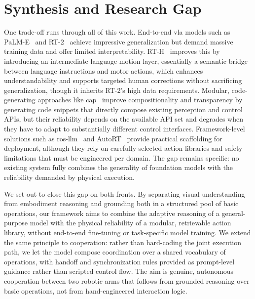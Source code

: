 \documentclass[
     12pt,
     a4paper,
     BCOR=10mm,
     DIV=14,
     listof=totoc,
     bibliography=totoc,
     parskip,
     twoside,
     headsepline
     ]{scrreprt}
\begin{document}
\section{Synthesis and Research Gap}
One trade-off runs through all of this work. End-to-end \gls{vla} models such as PaLM-E~\cite{driess2023palmeembodiedmultimodallanguage} and RT-2~\cite{brohan2023rt2visionlanguageactionmodelstransfer} achieve impressive generalization but demand massive training data and offer limited interpretability. RT-H~\cite{belkhale2024rthactionhierarchiesusing} improves this by introducing an intermediate language-motion layer, essentially a semantic bridge between language instructions and motor actions, which enhances understandability and supports targeted human corrections without sacrificing generalization, though it inherits RT-2's high data requirements. Modular, code-generating approaches like \gls{cap}~\cite{liang2023codepolicieslanguagemodel} improve compositionality and transparency by generating code snippets that directly compose existing perception and control APIs, but their reliability depends on the available API set and degrades when they have to adapt to substantially different control interfaces. Framework-level solutions such as \gls{ros}-\gls{llm}~\cite{Mower_2026} and AutoRT~\cite{ahn2024autortembodiedfoundationmodels} provide practical scaffolding for deployment, although they rely on carefully selected action libraries and safety limitations that must be engineered per domain. The gap remains specific: no existing system fully combines the generality of foundation models with the reliability demanded by physical execution.

We set out to close this gap on both fronts. By separating visual understanding from embodiment reasoning and grounding both in a structured pool of basic operations, our framework aims to combine the adaptive reasoning of a general-purpose model with the physical reliability of a modular, retrievable action library, without end-to-end fine-tuning or task-specific model training. We extend the same principle to cooperation: rather than hard-coding the joint execution path, we let the model compose coordination over a shared vocabulary of operations, with handoff and synchronization rules provided as prompt-level guidance rather than scripted control flow. The aim is genuine, autonomous cooperation between two robotic arms that follows from grounded reasoning over basic operations, not from hand-engineered interaction logic.
\end{document}
